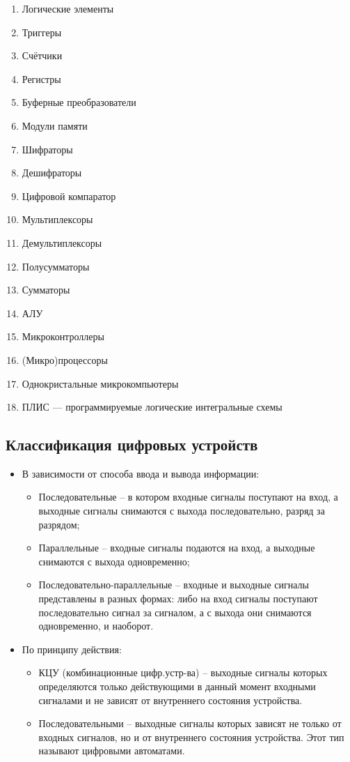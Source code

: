\documentclass[unicode, 12pt, a4paper, oneside]{article}
\begin{document}
\begin{enumerate}
\item Логические элементы
\item Триггеры
\item Счётчики
\item Регистры
\item Буферные преобразователи
\item Модули памяти
\item Шифраторы
\item Дешифраторы
\item Цифровой компаратор
\item Мультиплексоры
\item Демультиплексоры
\item Полусумматоры
\item Сумматоры
\item АЛУ
\item Микроконтроллеры
\item (Микро)процессоры
\item Однокристальные микрокомпьютеры
\item ПЛИС — программируемые логические интегральные схемы
\end{enumerate}

\subsection*{Классификация цифровых устройств}

\begin{itemize}
\item В зависимости от способа  ввода и вывода информации:
	\begin{itemize}
	\item Последовательные – в котором входные сигналы поступают на вход, а выходные сигналы снимаются с выхода последовательно, разряд за разрядом;
	\item Параллельные – входные сигналы подаются на вход, а выходные снимаются с выхода одновременно;
	\item Последовательно-параллельные – входные и выходные сигналы представлены в разных формах: либо на вход сигналы поступают последовательно сигнал за сигналом, а с выхода они снимаются одновременно, и наоборот.
	\end{itemize}
\item По принципу действия:
	\begin{itemize}
	\item КЦУ (комбинационные цифр.устр-ва) – выходные сигналы которых определяются только действующими в данный момент входными сигналами и не зависят от внутреннего состояния устройства.
	\item Последовательными – выходные сигналы которых зависят не только от входных сигналов, но и от внутреннего состояния устройства. Этот тип называют цифровыми автоматами.
	\end{itemize}
\end{itemize}
\end{document}
